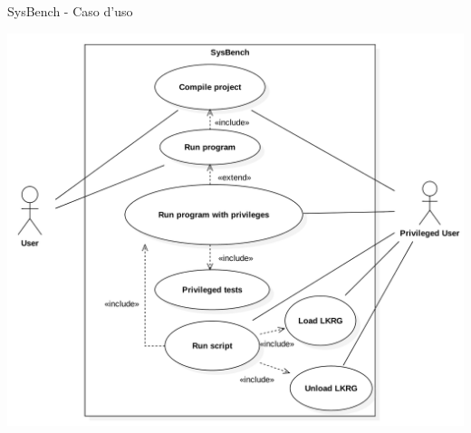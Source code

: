 \documentclass[12pt]{beamer}
\begin{document}
  \begin{frame}[fragile]{SysBench - Caso d'uso}
    \begin{center}
    	\includegraphics[scale=0.18]{res/UseCase}
    \end{center}
  \end{frame}
\end{document}
